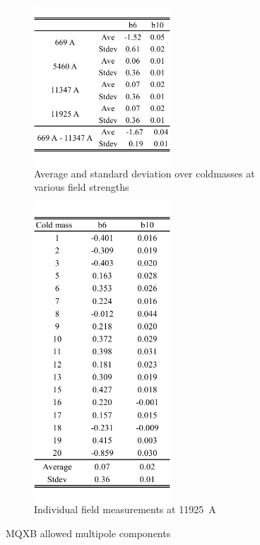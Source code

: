 \begin{figure}[h!]
    \centering
    \begin{subfigure}{.45\textwidth}
        \includegraphics[width=5.11cm]{images/mqxb_b6_summary.pdf}
        \caption{Average and standard deviation over coldmasses at various field strengths}
        \label{fig:MQXBb6SummaryColdmasses}
    \end{subfigure}
    \begin{subfigure}{.45\textwidth}
        \includegraphics[width=5.11cm]{images/mqxb_b6_coldmass.pdf}
        \caption{Individual field measurements at \SI{11925}{\ampere}}
    \end{subfigure}
    \caption{MQXB allowed multipole components}
    \label{fig:MQXBb6Summary}
\end{figure}



